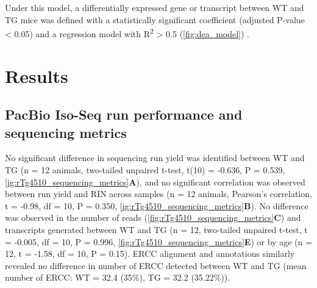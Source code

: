 Under this model, a differentially expressed gene or transcript between WT and TG mice was defined with a statistically significant coefficient (adjusted P-value < 0.05) and a regression model with R\textsuperscript{2} > 0.5  (\cref{fig:dea_model}) .


\clearpage 
\section{Results}
\subsection{PacBio Iso-Seq run performance and sequencing metrics}
No significant difference in sequencing run yield was identified between WT and TG (n = 12 animals, two-tailed unpaired t-test, t(10) = -0.636, P = 0.539, \cref{ig:rTg4510_sequencing_metrics}\textbf{A}), and no significant correlation was observed between run yield and RIN across samples (n = 12 animals, Pearson's correlation, t = -0.98, df = 10, P = 0.350, \cref{ig:rTg4510_sequencing_metrics}\textbf{B}). No difference was observed in the number of reads (\cref{fig:rTg4510_sequencing_metrics}\textbf{C}) and transcripts generated between WT and TG (n = 12, two-tailed unpaired t-test, t = -0.005, df = 10, P = 0.996, \cref{fig:rTg4510_sequencing_metrics}\textbf{E}) or by age (n = 12, t = -1.58, df = 10, P = 0.15). ERCC alignment and annotations similarly revealed no difference in number of ERCC detected between WT and TG (mean number of ERCC: WT = 32.4 (35\%), TG = 32.2 (35.22\%)). 

